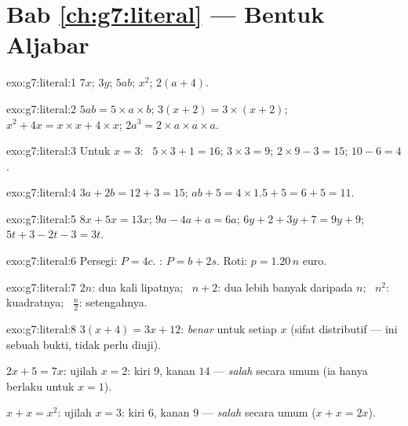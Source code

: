 \section*{Bab \ref{ch:g7:literal} --- Bentuk Aljabar}

\begin{solution}{exo:g7:literal:1}
$7x$; \quad $3y$; \quad $5ab$; \quad $x^2$; \quad $2(a + 4)$.
\end{solution}

\begin{solution}{exo:g7:literal:2}
$5ab = 5 \times a \times b$; \quad
$3(x+2) = 3 \times (x + 2)$; \quad
$x^2 + 4x = x \times x + 4 \times x$; \quad
$2a^3 = 2 \times a \times a \times a$.
\end{solution}

\begin{solution}{exo:g7:literal:3}
Untuk $x = 3$: \ $5 \times 3 + 1 = 16$; \quad $3 \times 3 = 9$; \quad
$2 \times 9 - 3 = 15$; \quad $10 - 6 = 4$.
\end{solution}

\begin{solution}{exo:g7:literal:4}
$3a + 2b = 12 + 3 = 15$; \qquad
$ab + 5 = 4 \times 1.5 + 5 = 6 + 5 = 11$.
\end{solution}

\begin{solution}{exo:g7:literal:5}
$8x + 5x = 13x$; \quad
$9a - 4a + a = 6a$; \quad
$6y + 2 + 3y + 7 = 9y + 9$; \quad
$5t + 3 - 2t - 3 = 3t$.
\end{solution}

\begin{solution}{exo:g7:literal:6}
Persegi: $P = 4c$. : $P = b + 2s$. Roti:
$p = 1.20\,n$ euro.
\end{solution}

\begin{solution}{exo:g7:literal:7}
$2n$: dua kali lipatnya; \ $n + 2$: dua lebih banyak daripada $n$;
\ $n^2$: kuadratnya; \ $\frac n2$: setengahnya.
\end{solution}

\begin{solution}{exo:g7:literal:8}
$3(x+4) = 3x + 12$: \emph{benar} untuk setiap $x$ (sifat distributif
--- ini sebuah bukti, tidak perlu diuji).

$2x + 5 = 7x$: ujilah $x = 2$: kiri $9$, kanan $14$ --- \emph{salah}
secara umum (ia hanya berlaku untuk $x = 1$).

$x + x = x^2$: ujilah $x = 3$: kiri $6$, kanan $9$ --- \emph{salah}
secara umum ($x + x = 2x$).
\end{solution}

